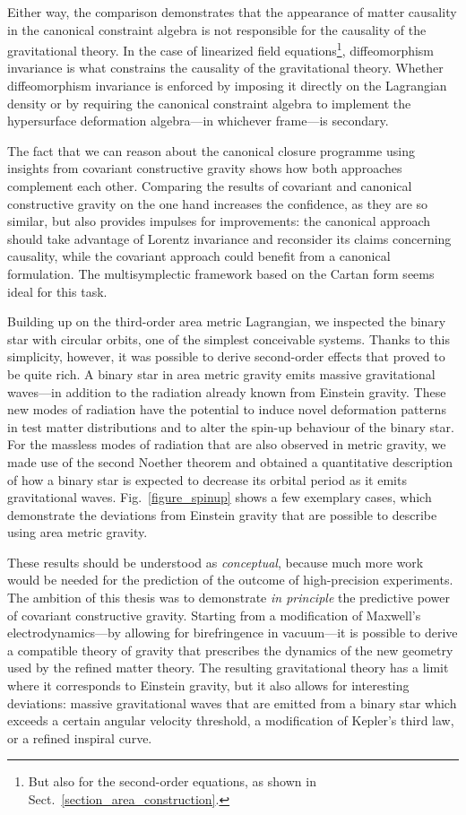 Either way, the comparison demonstrates that the appearance of matter causality in the canonical constraint algebra is not responsible for the causality of the gravitational theory. In the case of linearized field equations\footnote{But also for the second-order equations, as shown in Sect.~\ref{section_area_construction}.}, diffeomorphism invariance is what constrains the causality of the gravitational theory. Whether diffeomorphism invariance is enforced by imposing it directly on the Lagrangian density or by requiring the canonical constraint algebra to implement the hypersurface deformation algebra---in whichever frame---is secondary.

The fact that we can reason about the canonical closure programme using insights from covariant constructive gravity shows how both approaches complement each other. Comparing the results of covariant and canonical constructive gravity on the one hand increases the confidence, as they are so similar, but also provides impulses for improvements: the canonical approach should take advantage of Lorentz invariance and reconsider its claims concerning causality, while the covariant approach could benefit from a canonical formulation. The multisymplectic framework based on the Cartan form \cite{Gotay_1991} seems ideal for this task.

Building up on the third-order area metric Lagrangian, we inspected the binary star with circular orbits, one of the simplest conceivable systems. Thanks to this simplicity, however, it was possible to derive second-order effects that proved to be quite rich. A binary star in area metric gravity emits massive gravitational waves---in addition to the radiation already known from Einstein gravity. These new modes of radiation have the potential to induce novel deformation patterns in test matter distributions and to alter the spin-up behaviour of the binary star. For the massless modes of radiation that are also observed in metric gravity, we made use of the second Noether theorem and obtained a quantitative description of how a binary star is expected to decrease its orbital period as it emits gravitational waves. Fig.~\ref{figure_spinup} shows a few exemplary cases, which demonstrate the deviations from Einstein gravity that are possible to describe using area metric gravity.

These results should be understood as \emph{conceptual}, because much more work would be needed for the prediction of the outcome of high-precision experiments. The ambition of this thesis was to demonstrate \emph{in principle} the predictive power of covariant constructive gravity. Starting from a modification of Maxwell's electrodynamics---by allowing for birefringence in vacuum---it is possible to derive a compatible theory of gravity that prescribes the dynamics of the new geometry used by the refined matter theory. The resulting gravitational theory has a limit where it corresponds to Einstein gravity, but it also allows for interesting deviations: massive gravitational waves that are emitted from a binary star which exceeds a certain angular velocity threshold, a modification of Kepler's third law, or a refined inspiral curve.

